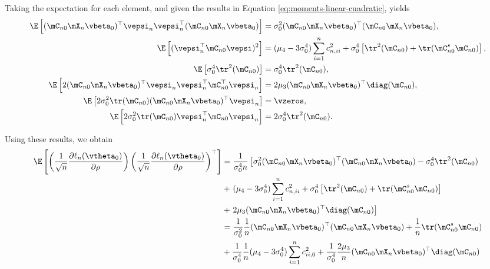 \documentclass[english,12pt]{book}\usepackage[]{graphicx}\usepackage[]{xcolor}
\begin{document}
\begin{subappendices}
Taking the expectation for each element, and given the results in Equation \eqref{eq:moments-linear-cuadratic}, yields
\begin{align*}
 \E\left[(\mC_{n0}\mX_n\vbeta_0)^\top \vepsi_n\vepsi_n^\top(\mC_{n0}\mX_n\vbeta_0)\right] & = \sigma_0^2(\mC_{n0}\mX_n\vbeta_0)^\top(\mC_{n0}\mX_n\vbeta_0), \\
 \E\left[(\vepsi_n^\top\mC_{n0}\vepsi)^2\right] & = (\mu_4 - 3\sigma^4_0)\sum_{i = 1}^nc_{n,ii}^2 + \sigma^4_0\left[\tr^2(\mC_{n0}) + \tr(\mC_{n0}^s\mC_{n0})\right], \\
  \E\left[\sigma_{0}^4\tr^2(\mC_{n0})\right] & = \sigma_0^4\tr^2(\mC_{n0}), \\
  \E\left[2(\mC_{n0}\mX_n\vbeta_0)^\top \vepsi_n\vepsi_n^\top\mC_{n0}^\top\vepsi_n\right] & = 2\mu_3(\mC_{n0}\mX_n\vbeta_0)^\top\diag(\mC_{n0}), \\
  \E\left[2\sigma_{0}^2\tr(\mC_{n0})(\mC_{n0}\mX_n\vbeta_0)^\top \vepsi_n\right] & = \vzeros, \\
  \E\left[2\sigma_{0}^2\tr(\mC_{n0})\vepsi_n^\top\mC_{n0}\vepsi_n\right] & = 2\sigma_0^4\tr^2(\mC_{n0}).
\end{align*}

Using these results, we obtain 
\begin{equation*}
\begin{aligned}
  \E\left[\left(\frac{1}{\sqrt{n}}\frac{\partial \ell_n(\vtheta_0)}{\partial \rho}\right) \left(\frac{1}{\sqrt{n}}\frac{\partial \ell_n(\vtheta_0)}{\partial \rho}\right)^\top\right] & = \frac{1}{\sigma_0^4n}\left[\sigma_0^2(\mC_{n0}\mX_n\vbeta_0)^\top(\mC_{n0}\mX_n\vbeta_0) - \sigma_0^4\tr^2(\mC_{n0})\right. \\
  & + \left. (\mu_4 - 3\sigma^4_0)\sum_{i = 1}^nc_{n,ii}^2 + \sigma^4_0\left[\tr^2(\mC_{n0}) + \tr(\mC_{n0}^s\mC_{n0})\right] \right. \\
  & + \left.2\mu_3(\mC_{n0}\mX_n\vbeta_0)^\top\diag(\mC_{n0})\right] \\
 & =   \frac{1}{\sigma_0^2}\frac{1}{n}(\mC_{n0}\mX_n\vbeta_0)^\top(\mC_{n0}\mX_n\vbeta_0) + \frac{1}{n}\tr(\mC_{n0}^s\mC_{n0}) \\
 &  + \frac{1}{\sigma_0^4}\frac{1}{n}(\mu_4 - 3\sigma^4_0)\sum_{i = 1}^nc_{ii,0}^2 + \frac{1}{\sigma_0^4}\frac{2\mu_3}{n}(\mC_{n0}\mX_n\vbeta_0)^\top\diag(\mC_{n0})
\end{aligned}
\end{equation*}


\end{subappendices}
\end{document}
